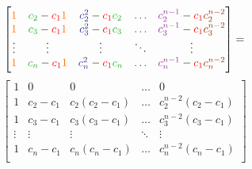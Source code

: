 \documentclass[11pt,a4paper]{article}
\begin{document}
{\[\begin{bmatrix}
\textcolor{Laranja}{1} & \textcolor{Verde}{c_2}  - \textcolor{red}{c_1}\textcolor{Laranja}{1}  &  \textcolor{Blue}{c_2^2} - \textcolor{red}{c_1}\textcolor{Verde}{c_2}  & \textcolor{RawSienna}{\dots}  & \textcolor{Purple}{c_2^{n-1}} - \textcolor{red}{c_1}\textcolor{RawSienna}{c_2^{n-2}}\\ 
\textcolor{Laranja}{1} &  \textcolor{Verde}{c_3}  - \textcolor{red}{c_1}\textcolor{Laranja}{1} & \textcolor{Blue}{c_3^2} - \textcolor{red}{c_1}\textcolor{Verde}{c_3}  & \textcolor{RawSienna}{\dots}  & \textcolor{Purple}{c_3^{n-1}} - \textcolor{red}{c_1}\textcolor{RawSienna}{c_3^{n-2}}\\
\vdots & \vdots & \vdots & \ddots  &\vdots \\ 
\textcolor{Laranja}{1} &  \textcolor{Verde}{c_n}  - \textcolor{red}{c_1}\textcolor{Laranja}{1}  & \textcolor{Blue}{c_n^2} - \textcolor{red}{c_1}\textcolor{Verde}{c_n} & \textcolor{RawSienna}{\dots}  & \textcolor{Purple}{c_n^{n-1}} - \textcolor{red}{c_1}\textcolor{RawSienna}{c_n^{n-2}}\\ \end{bmatrix}=\]
\[\begin{bmatrix} 1 & 0 & 0 & \dots & 0\\ 1 & c_2-c_1 & c_2(c_2-c_1) & \dots & c_2^{n-2}(c_2-c_1)\\ 1 & c_3-c_1 & c_3(c_3-c_1) & \dots & c_3^{n-2}(c_3-c_1)\\ \vdots & \vdots & \vdots & \ddots &\vdots \\ 1 & c_n-c_1 & c_n(c_n-c_1) & \dots & c_n^{n-2}(c_n-c_1)\\ \end{bmatrix}\]

}
\end{document}
